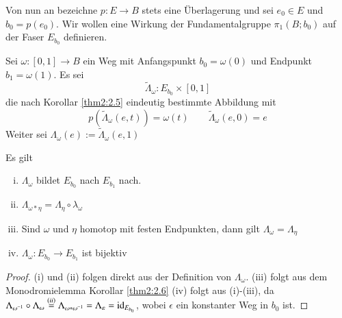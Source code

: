 \documentclass[a4paper,10pt]{scrartcl}
\begin{document}
Von nun an bezeichne $p: E \to B$ stets eine Überlagerung und sei $e_0 \in E$ und $b_0=p(e_0)$.
Wir wollen eine Wirkung der Fundamentalgruppe $\pi_1(B; b_0)$ auf der Faser $E_{b_0}$ definieren.\\

\begin{df}
 Sei $\omega:[0,1]\to B$ ein Weg mit Anfangspunkt $b_0=\omega(0)$ und Endpunkt $b_1=\omega(1)$. Es sei
\[
 \tilde \Lambda_\omega: E_{b_0} \times [0,1]
\]
die nach Korollar \ref{thm2:2.5} eindeutig bestimmte Abbildung mit
\[
 p(\tilde \Lambda_\omega (e,t))=\omega(t) \qquad \tilde \Lambda_{\omega}(e,0)=e
\]
Weiter sei $\Lambda_\omega(e):= \tilde \Lambda_\omega(e,1)$
\end{df}
\begin{lem}\label{thm2:3.7}
 Es gilt
\begin{enumerate}[(i)]
 \item $\Lambda_\omega$ bildet $E_{b_0}$ nach $E_{b_1}$ nach.
 \item $\Lambda_{\omega*\eta}=\Lambda_{\eta} \circ \lambda_\omega$
 \item Sind $\omega$ und $\eta$ homotop mit festen Endpunkten, dann gilt $\Lambda_\omega=\Lambda_\eta$
 \item $\Lambda_\omega: E_{b_0} \to E_{b_1}$ ist bijektiv
\end{enumerate}
\end{lem}
\begin{proof}
 (i) und (ii)  folgen direkt aus der Definition von $\Lambda_\omega$. (iii) folgt aus dem Monodromielemma Korollar \ref{thm2:2.6} (iv) folgt aus (i)-(iii), da $\Lambda_{\omega^{-1}}\circ \Lambda_\omega\stackrel{(ii)}{=} \Lambda_{\omega*\omega^{-1}}=\Lambda_\varepsilon=\operatorname{id}_{E_{b_0}}$, wobei $\epsilon$ ein konstanter Weg in $b_0$ ist. 
\end{proof}
\end{document}
